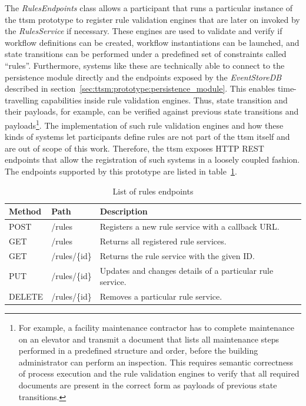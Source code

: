 The \textit{RulesEndpoints} class allows a participant that runs a particular instance of the \gls{ttsm} prototype to register rule validation engines that are later on invoked by the \textit{RulesService} if necessary. These engines are used to validate and verify if workflow definitions can be created, workflow instantiations can be launched, and state transitions can be performed under a predefined set of constraints called ``rules''. Furthermore, systems like these are technically able to connect to the persistence module directly and the endpoints exposed by the \textit{EventStoreDB} described in section~\ref{sec:ttsm:prototype:persistence_module}. This enables time-travelling capabilities inside rule validation engines. Thus, state transition and their payloads, for example, can be verified against previous state transitions and payloads\footnote{For example, a facility maintenance contractor has to complete maintenance on an elevator and transmit a document that lists all maintenance steps performed in a predefined structure and order, before the building administrator can perform an inspection. This requires semantic correctness of process execution and the rule validation engines to verify that all required documents are present in the correct form as payloads of previous state transitions.}. The implementation of such rule validation engines and how these kinds of systems let participants define rules are not part of the \gls{ttsm} itself and are out of scope of this work. Therefore, the \gls{ttsm} exposes HTTP REST endpoints that allow the registration of such systems in a loosely coupled fashion. The endpoints supported by this prototype are listed in table~\ref{tab:ttsm:prototype:rules_endpoints}.

\begin{table}[h]
\centering
\begin{tabular}{|l|l|l|}
    \hline
    \textbf{Method} & \textbf{Path} & \textbf{Description}\\
    \hline
    POST & /rules & Registers a new rule service with a callback URL.\\
    GET & /rules & Returns all registered rule services.\\
    GET & /rules/\{id\} & Returns the rule service with the given ID.\\
    PUT & /rules/\{id\} & Updates and changes details of a particular rule service.\\
    DELETE & /rules/\{id\} & Removes a particular rule service.\\
    \hline
\end{tabular}
\caption{List of rules endpoints}
\label{tab:ttsm:prototype:rules_endpoints}
\end{table}


